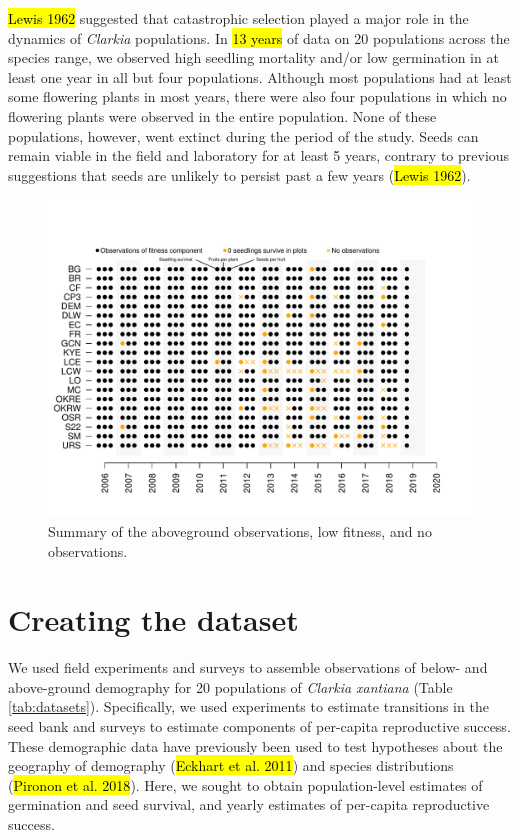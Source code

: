 \documentclass[12pt, oneside, titlepage]{article}   	%
\begin{document}
\hl{Lewis 1962} suggested that catastrophic selection played a major role in the dynamics of \textit{Clarkia} populations. In \hl{13 years} of data on 20 populations across the species range, we observed high seedling mortality and/or low germination in at least one year in all but four populations. Although most populations had at least some flowering plants in most years, there were also four populations in which no flowering plants were observed in the entire population. None of these populations, however, went extinct during the period of the study. Seeds can remain viable in the field and laboratory for at least 5 years, contrary to previous suggestions that seeds are unlikely to persist past a few years (\hl{Lewis 1962}). 

\begin{figure}[!h]
       \includegraphics[width=\textwidth]{../../figures/analysis/zero-fitness.pdf}  
    \caption{ Summary of the aboveground observations, low fitness, and no observations. }
 \label{fig:zero-fitness}
\end{figure}


\section{Creating the dataset}

We used field experiments and surveys to assemble observations of below- and above-ground demography for 20 populations of \textit{Clarkia xantiana} (Table \ref{tab:datasets}). Specifically, we used experiments to estimate transitions in the seed bank and surveys to estimate components of per-capita reproductive success. These demographic data have previously been used to test hypotheses about the geography of demography (\hl{Eckhart et al. 2011}) and species distributions (\hl{Pironon et al. 2018}). Here, we sought to obtain population-level estimates of germination and seed survival, and yearly estimates of per-capita reproductive success.
\end{document}
